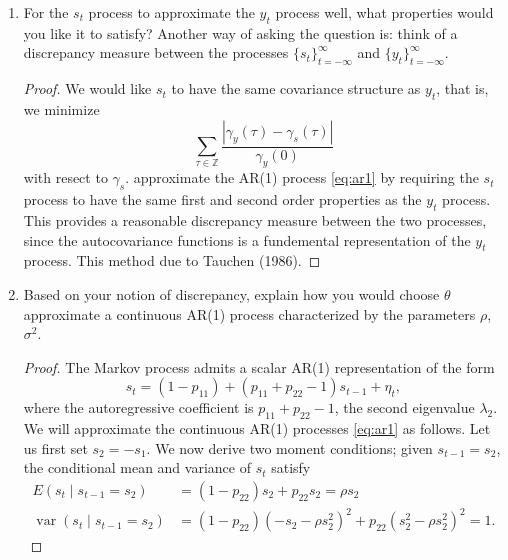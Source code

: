 \documentclass[oneside,reqno]{amsart}
\DeclareMathOperator{\var}{var}
\newcommand{\Z}{\mathds Z}
\theoremstyle{definition}
\begin{document}
\begin{enumerate}[label=(\roman*)]
\begin{proof}
\begin{python3code}
def sample(pi):
    a = 0.0
    U = uniform(0,1)
    for i in range(len(pi)):
        if a < U <= a + pi[i]:
            return i
        a += pi[i]
        
class MarkovChain:
    def __init__(self, p=None, X=None):
        self.p, self.X = p, X
        
    def update(self):
        self.X = sample(self.p[self.X])
        
    def sample_path(self, n):
        path = []
        for i in range(n):
            path.append(self.X)
            self.update()
        return path
\end{python3code}        
\end{proof}
\item
For the $s_t$ process to approximate the $y_t$ process well, what properties would you like it to satisfy? Another way of asking the question is: think of a discrepancy measure between the processes $\{s_t\}_{t=-\infty}^\infty$ and $\{y_t\}_{t=-\infty}^\infty$.
\begin{proof}
We would like $s_t$ to have the same covariance structure as $y_t$, that is, we minimize 
\[
	\sum_{\tau\in \Z} \frac{|\gamma_y(\tau) - \gamma_s(\tau)|}{\gamma_y(0)}
\] 
with resect to $\gamma_s$. approximate the AR(1) process \eqref{eq:ar1} by requiring the $s_t$ process to have the same first and second order properties as the $y_t$ process. This provides a reasonable discrepancy measure between the two processes, since the autocovariance functions is a fundemental representation of the $y_t$ process. This method due to Tauchen (1986). 
\end{proof}
\item
Based on your notion of discrepancy, explain how you would choose $\theta$  approximate a continuous AR(1) process characterized by the parameters $\rho$, $\sigma^2$.
\begin{proof}
The Markov process admits a scalar AR(1) representation of the form 
\[
	s_t  = (1 - p_{11}) + (p_{11} + p_{22}-1) s_{t-1} + \eta_t,
\]
where the autoregressive coefficient is $p_{11} + p_{22}-1$, the second eigenvalue $\lambda_2$. We will approximate the continuous AR(1) processes \eqref{eq:ar1} as follows. Let us first set $s_2 =  -s_1$. We now derive two moment conditions; given $s_{t-1}=s_2$, the conditional mean and variance of $s_t$ satisfy 
\begin{align*}
	E(s_t \mid s_{t-1}=s_2) &= (1-p_{22}) s_2  + p_{22}s_2 = \rho s_2 \\
	\var(s_t \mid s_{t-1} = s_2) &= (1-p_{22}) (-s_2 -\rho s_2^2)^2 + p_{22}(s_2^2 - \rho s_2^2)^2 = 1.

\end{align*}
\end{proof}
\end{enumerate}
\end{document}

